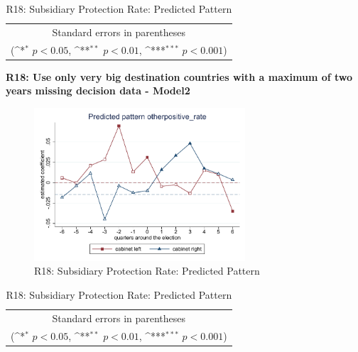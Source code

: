 \documentclass[10pt,a4paper]{scrartcl}
\begin{document}
\begin{table}[!ht]\centering
	\renewcommand{\arraystretch}{1.25}
	\def\sym#1{\ifmmode^{#1}\else\(^{#1}\)\fi}
	\caption{R18: Subsidiary Protection Rate: Predicted Pattern}
	\begin{tabular}{l*{2}{c}}
		\hline\hline
		
		\hline\hline
		\multicolumn{3}{c}{\footnotesize Standard errors in parentheses} \\
		\multicolumn{3}{c}{\footnotesize (\sym{*} \(p<0.05\), \sym{**} \(p<0.01\), \sym{***} \(p<0.001\))}\\
	\end{tabular}
\end{table}

\clearpage
\textbf{R18: Use only very big destination countries with a maximum of two years missing decision data - Model2}
\begin{figure}[!ht]
	\centering
	\includegraphics[width=0.7\textwidth]{figures_edited/otherpositive_rate_graph2_R18.pdf}
	\caption{R18: Subsidiary Protection Rate: Predicted Pattern}
\end{figure}

\begin{table}[!ht]\centering
	\footnotesize
	\renewcommand{\arraystretch}{1.15}
	\def\sym#1{\ifmmode^{#1}\else\(^{#1}\)\fi}
	\caption{R18: Subsidiary Protection Rate: Predicted Pattern}
	\begin{tabular}{l*{2}{c}}
		\hline\hline
		
		\hline\hline
		\multicolumn{3}{c}{\footnotesize Standard errors in parentheses} \\
		\multicolumn{3}{c}{\footnotesize (\sym{*} \(p<0.05\), \sym{**} \(p<0.01\), \sym{***} \(p<0.001\))} \\
	\end{tabular}
\end{table}
\end{document}
